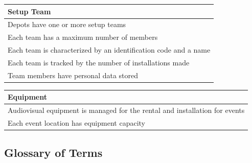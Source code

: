 \begin{table}[H]
\centering
\begin{tabular}{|p{15cm}|}
\hline
\textbf{Setup Team} \\
\hline
Depots have one or more setup teams \\
\hline
Each team has a maximum number of members \\
\hline
Each team is characterized by an identification code and a name \\
\hline
Each team is tracked by the number of installations made \\
\hline
Team members have personal data stored \\
\hline
\end{tabular}
\end{table}


\begin{table}[H]
\centering
\begin{tabular}{|p{15cm}|}
\hline
\textbf{Equipment} \\
\hline
Audiovisual equipment is managed for the rental and installation for events \\
\hline
Each event location has equipment capacity \\
\hline
\end{tabular}
\end{table}

\subsection{Glossary of Terms}

